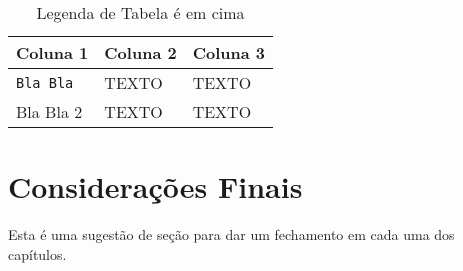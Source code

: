 \begin{table}[h!]
\renewcommand{\arraystretch}{1.3}
\caption{Legenda de Tabela é em cima}
\label{tab:exemplo-001}
\centering
\begin{tabular}{|@{$~$}l@{ }||@{$~$}l@{ }|@{$~$}l@{ }|}
\hline
\textbf{Coluna 1} & \textbf{Coluna 2} & \textbf{Coluna 3} \\
\hline
\begin{minipage}[t]{0.10\textwidth}%
\texttt{Bla Bla} %
\end{minipage} & 
\begin{minipage}[t]{0.30\textwidth}%
  TEXTO %
\end{minipage} &
\begin{minipage}[t]{0.50\textwidth}%
TEXTO %
\end{minipage}
\tabularnewline
\hline
\begin{minipage}[t]{0.10\textwidth}%
Bla Bla 2 %
\end{minipage} & 
\begin{minipage}[t]{0.30\textwidth}%
TEXTO %
\end{minipage} &
\begin{minipage}[t]{0.50\textwidth}%
TEXTO %
\end{minipage}
\tabularnewline
\hline
\end{tabular}
\end{table}

\section{Considerações Finais}
\label{cap:conceitos:sec:consideracoes:finais}

Esta é uma sugestão de seção para dar um fechamento em cada uma dos capítulos.